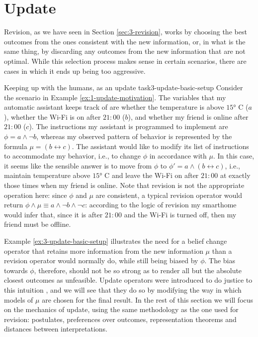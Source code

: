 \section{Update}\label{sec:3-update}
Revision, as we have seen in Section \ref{sec:3-revision},
works by choosing the best outcomes from the ones consistent 
with the new information,
or, in what is the same thing,
by discarding any outcomes from the new information
that are not optimal.
While this selection process makes sense in certain scenarios,
there are cases in which it ends up being too aggressive.

\begin{xmpl}{Keeping up with the humans, as an update task}{3-update-basic-setup}
	Consider the scenario in Example \ref{ex:1-update-motivation}.
	The variables that my automatic assistant keeps track of are 
	whether the temperature is above $15\si{\degree}$ C ($a$),
	whether the Wi-Fi is on after $21{:}00$ ($b$),
	and whether my friend is online after $21{:}00$ ($c$).
	The instructions my assistant is programmed to implement 
	are $\phi=a\land \lnot b$,
	whereas my observed pattern of behavior is represented by the formula 
	$\mu=(b\leftrightarrow c)$.
	The assistant would like to
	modify its list of instructions to accommodate my behavior,
	i.e., to change $\phi$ in accordance with $\mu$.
	In this case, it seems like the sensible answer is 
	to move from $\phi$ to $\phi' = a\land (b \leftrightarrow c)$,
	i.e., maintain temperature above $15\si{\degree}$ C and 
	leave the Wi-Fi on after $21{:}00$
	at exactly those times when my friend is online.
	Note that revision is not the appropriate operation here:
	since $\phi$ and $\mu$ are consistent, a typical revision operator would 
	return $\phi\land\mu\equiv a\land\lnot b\land \lnot c$:
	according to the logic of revision
	my smarthome would infer that, 
	since it is after $21{:}00$ and the	Wi-Fi is turned off, 
	then my friend must be offline.
\end{xmpl}

Example \ref{ex:3-update-basic-setup} illustrates the need for a belief change operator
that retains more information from the new information $\mu$
than a revision operator would normally do,
while still being biased by $\phi$.
The bias towards $\phi$, therefore,
should not be so strong as to render all but the 
absolute closest outcomes as unfeasible.
Update operators were introduced to do justice to 
this intuition \cite{KatsunoM91},
and we will see that they do so by modifying
the way in which models of $\mu$ are chosen 
for the final result.
In the rest of this section we will focus on the mechanics
of update, using the same methodology as the one used for
revision: postulates, preferences over outcomes, 
representation theorems and distances between interpretations.

